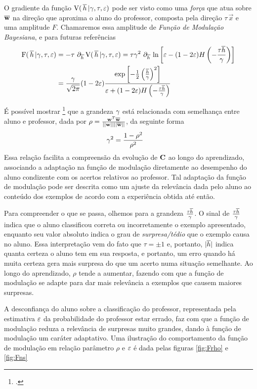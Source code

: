 \newcommand{\EF}{\ensuremath{\mathrm{F}(\,\htv\,|\gmt,\tau,\ns)}} O gradiente da função $\mathrm{V}(\,\overline{h}\,|\gamma,\tau,\varepsilon)$ pode ser visto como uma \emph{força} que atua sobre $\overline{\mathbf{w}}$ na direção que aproxima o aluno do professor, composta pela direção $\tau\,\vec{x}$ e uma amplitude $F$. Chamaremos essa amplitude de \emph{Função de Modulação Bayesiana}, e para futuras referências
\begin{align}\label{eq:f-bayes}
    \EF & = - {\tau}\,\del{\htv} \EV = {\tau\gmt^2}\,\del{\htv}
    \ln\inbk{\ns-(1-2\ns)H\inpr{-\frac{\tau\htv}{\gmt}}} \notag \\ & =
    \frac{\gmt}{\sqrt{2\pi}}(1-2\ns)
    \frac{\exp\inbk{-\half\inpr{\frac{\htv}{\gmt}}^2}}{\ns + (1-2\ns)
      H\inpr{-\frac{\tau\htv}{\gmt}}}
\end{align}

É possível mostrar \footcite{Kinouchi1996,Vicente1998} que a grandeza $\gamma$ está relacionada com semelhança entre aluno e professor, dada por $\rho = \frac{\mathbf{w}^T\overline{\mathbf{w}}}{||\mathbf{w}||||\overline{\mathbf{w}}||}$, da seguinte forma
\begin{align}
    \gmt^2 & = \frac{1-\rho^2}{\rho^2}\label{eq:rho-def}
\end{align}
Essa relação facilita a compreensão da evolução de $\mathbf{C}$ ao longo do aprendizado, associando a adaptação na função de modulação diretamente ao desempenho do aluno condizente com os acertos relativos ao professor.
Tal adaptação da função de modulação pode ser descrita como um ajuste da relevância dada pelo aluno ao conteúdo dos exemplos de acordo com a experiência obtida até então.

Para compreender o que se passa, olhemos para a grandeza $\frac{\tau\overline{h}}{\gamma}$.
O sinal de $\frac{\tau\overline{h}}{\gamma}$ indica que o aluno classificou correta ou incorretamente o exemplo apresentado, enquanto seu valor absoluto indica o grau de \emph{surpresa/tédio} que o exemplo causa no aluno.
Essa interpretação vem do fato que $\tau=\pm 1$ e, portanto, $|\overline{h}|$ indica quanta certeza o aluno tem em sua resposta, e portanto, um erro quando há muita certeza gera mais surpresa do que um acerto numa situação semelhante.  Ao longo do aprendizado, $\rho$ tende a aumentar, fazendo com que a função de modulação se adapte para dar mais relevância a exemplos que causem maiores surpresas.

A desconfiança do aluno sobre a classificação do professor, representada pela estimativa $\varepsilon$ da probabilidade do professor estar errado, faz com que a função de modulação reduza a relevância de surpresas muito grandes, dando à função de modulação um caráter adaptativo.
Uma ilustração do comportamento da função de modulação em relação parâmetro $\rho$ e $\varepsilon$ é dada pelas figuras \ref{fig:Frho} e \ref{fig:Fns}

